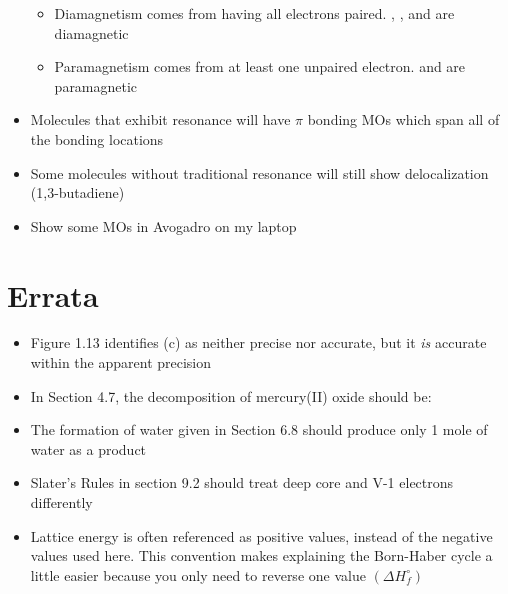 \documentclass[12pt, openany, letterpaper]{memoir}
\begin{document}
\begin{itemize}
\begin{itemize}
		      \item Diamagnetism comes from having all electrons paired. , , and  are diamagnetic
		      \item Paramagnetism comes from at least one unpaired electron.  and  are paramagnetic
	      \end{itemize}
	\item Molecules that exhibit resonance will have $\pi$ bonding MOs which span all of the bonding locations
	\item Some molecules without traditional resonance will still show delocalization (1,3-butadiene)
	\item Show some MOs in Avogadro on my laptop
\end{itemize}


\backmatter
\chapter{Errata}
\begin{itemize}
	\item Figure 1.13 identifies (c) as neither precise nor accurate, but it \emph{is} accurate within the apparent precision
	\item In Section 4.7, the decomposition of mercury(II) oxide should be: 
	\item The formation of water given in Section 6.8 should produce only 1 mole of water as a product
	\item Slater's Rules in section 9.2 should treat deep core and V-1 electrons differently
	\item Lattice energy is often referenced as positive values, instead of the negative values used here. This convention makes explaining the Born-Haber cycle a little easier because you only need to reverse one value $\left(\Delta H^\circ_f\right)$
\end{itemize}
\end{document}
